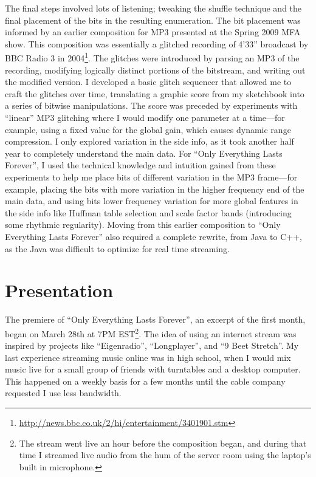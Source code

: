 \documentclass{thesis}
\begin{document}
The final steps involved lots of listening; tweaking the shuffle technique and the final placement of the bits in the resulting enumeration. The bit placement was informed by an earlier composition for MP3 presented at the Spring 2009 MFA show. This composition was essentially a glitched recording of 4'33'' broadcast by BBC Radio 3 in 2004\footnote{\url{http://news.bbc.co.uk/2/hi/entertainment/3401901.stm}}. The glitches were introduced by parsing an MP3 of the recording, modifying logically distinct portions of the bitstream, and writing out the modified version. I developed a basic glitch sequencer that allowed me to craft the glitches over time, translating a graphic score from my sketchbook into a series of bitwise manipulations. The score was preceded by experiments with ``linear'' MP3 glitching where I would modify one parameter at a time---for example, using a fixed value for the global gain, which causes dynamic range compression. I only explored variation in the side info, as it took another half year to completely understand the main data. For ``Only Everything Lasts Forever'', I used the technical knowledge and intuition gained from these experiments to help me place bits of different variation in the MP3 frame---for example, placing the bits with more variation in the higher frequency end of the main data, and using bits lower frequency variation for more global features in the side info like Huffman table selection and scale factor bands (introducing some rhythmic regularity). Moving from this earlier composition to ``Only Everything Lasts Forever'' also required a complete rewrite, from Java to C++, as the Java was difficult to optimize for real time streaming.

\section{Presentation}

The premiere of ``Only Everything Lasts Forever'', an excerpt of the first month, began on March 28th at 7PM EST\footnote{The stream went live an hour before the composition began, and during that time I streamed live audio from the hum of the server room using the laptop's built in microphone.}. The idea of using an internet stream was inspired by projects like ``Eigenradio'', ``Longplayer'', and ``9 Beet Stretch''. My last experience streaming music online was in high school, when I would mix music live for a small group of friends with turntables and a desktop computer. This happened on a weekly basis for a few months until the cable company requested I use less bandwidth.
\end{document}
